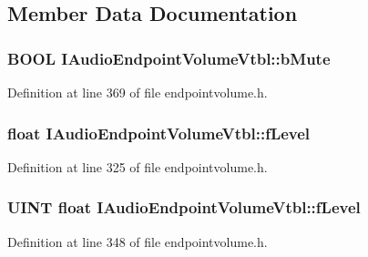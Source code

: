 \subsection{Member Data Documentation}
\subsubsection[{\texorpdfstring{b\+Mute}{bMute}}]{ {\bf B\+O\+OL} I\+Audio\+Endpoint\+Volume\+Vtbl\+::b\+Mute}\hypertarget{struct_i_audio_endpoint_volume_vtbl_a9d7b607874bd259d26a2c5cd3da7978e}{}\label{struct_i_audio_endpoint_volume_vtbl_a9d7b607874bd259d26a2c5cd3da7978e}


Definition at line 369 of file endpointvolume.\+h.

\subsubsection[{\texorpdfstring{f\+Level}{fLevel}}]{ float I\+Audio\+Endpoint\+Volume\+Vtbl\+::f\+Level}\hypertarget{struct_i_audio_endpoint_volume_vtbl_a0c193f24aca204aced08f145e0b02ccf}{}\label{struct_i_audio_endpoint_volume_vtbl_a0c193f24aca204aced08f145e0b02ccf}


Definition at line 325 of file endpointvolume.\+h.

\subsubsection[{\texorpdfstring{f\+Level}{fLevel}}]{ {\bf U\+I\+NT} float I\+Audio\+Endpoint\+Volume\+Vtbl\+::f\+Level}\hypertarget{struct_i_audio_endpoint_volume_vtbl_a40bec81d14abf43de9e7584d7d944eb2}{}\label{struct_i_audio_endpoint_volume_vtbl_a40bec81d14abf43de9e7584d7d944eb2}


Definition at line 348 of file endpointvolume.\+h.

